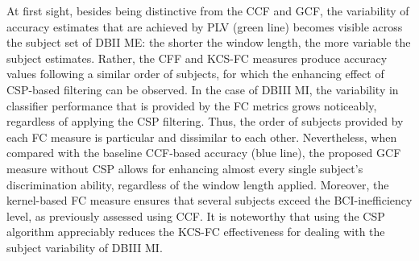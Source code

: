 At first sight, besides being distinctive from the CCF and GCF, the variability of accuracy estimates that are achieved by PLV (green line) becomes visible across the subject set of DBII ME: the shorter the window length, the more variable the subject estimates. Rather, the CFF and KCS-FC measures produce accuracy values following a similar order of subjects, for which the enhancing effect of CSP-based filtering can be observed. In the case of DBIII MI, the variability in classifier performance that is provided by the FC metrics grows noticeably, regardless of applying the CSP filtering. Thus, the order of subjects provided by each FC measure is particular and dissimilar to each other. Nevertheless, when compared with the baseline CCF-based accuracy (blue line), the proposed GCF measure without CSP allows for enhancing almost every single subject's discrimination ability, regardless of the window length applied. Moreover, the kernel-based FC measure ensures that several subjects exceed the BCI-inefficiency level, as previously assessed using CCF. It is noteworthy that using the CSP algorithm appreciably reduces the KCS-FC effectiveness for dealing with the subject variability of DBIII MI. 

